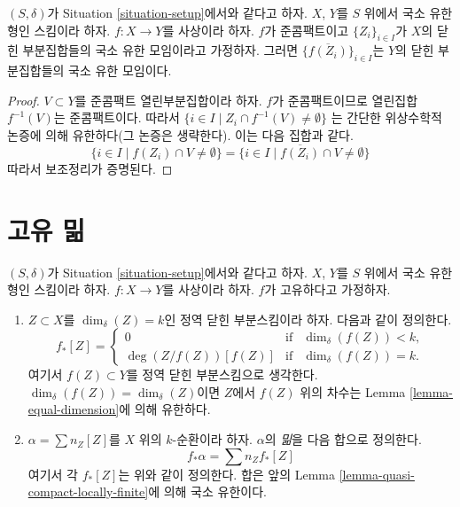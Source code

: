 \begin{lemma}
\label{lemma-quasi-compact-locally-finite}
$(S, \delta)$가 Situation \ref{situation-setup}에서와 같다고 하자.
$X$, $Y$를 $S$ 위에서 국소 유한형인 스킴이라 하자.
$f : X \to Y$를 사상이라 하자.
$f$가 준콤팩트이고 $\{Z_i\}_{i \in I}$가 $X$의 닫힌 부분집합들의
국소 유한 모임이라고 가정하자.
그러면 $\{\overline{f(Z_i)}\}_{i \in I}$는 $Y$의 닫힌 부분집합들의
국소 유한 모임이다.
\end{lemma}

\begin{proof}
$V \subset Y$를 준콤팩트 열린부분집합이라 하자.
$f$가 준콤팩트이므로 열린집합 $f^{-1}(V)$는 준콤팩트이다.
따라서
$\{i \in I \mid Z_i \cap f^{-1}(V) \not = \emptyset \}$
는 간단한 위상수학적 논증에 의해 유한하다(그 논증은 생략한다).
이는 다음 집합과 같다.
$$
\{i \in I \mid f(Z_i) \cap V \not = \emptyset \} =
\{i \in I \mid \overline{f(Z_i)} \cap V \not = \emptyset \}
$$
따라서 보조정리가 증명된다.
\end{proof}









\section{고유 밂}
\label{section-proper-pushforward}

\begin{definition}
\label{definition-proper-pushforward}
$(S, \delta)$가 Situation \ref{situation-setup}에서와 같다고 하자.
$X$, $Y$를 $S$ 위에서 국소 유한형인 스킴이라 하자.
$f : X \to Y$를 사상이라 하자.
$f$가 고유하다고 가정하자.
\begin{enumerate}
\item $Z \subset X$를 $\dim_\delta(Z) = k$인 정역 닫힌 부분스킴이라 하자.
다음과 같이 정의한다.
$$
f_*[Z] =
\left\{
\begin{matrix}
0 & \text{if} & \dim_\delta(f(Z))< k, \\
\deg(Z/f(Z)) [f(Z)] & \text{if} & \dim_\delta(f(Z)) = k.
\end{matrix}
\right.
$$
여기서 $f(Z) \subset Y$를 정역 닫힌 부분스킴으로 생각한다.
$\dim_\delta(f(Z)) = \dim_\delta(Z)$이면 $Z$에서 $f(Z)$ 위의 차수는
Lemma \ref{lemma-equal-dimension}에 의해 유한하다.
\item $\alpha = \sum n_Z [Z]$를 $X$ 위의 $k$-순환이라 하자. $\alpha$의
{\it 밂}을 다음 합으로 정의한다.
$$
f_* \alpha = \sum n_Z f_*[Z]
$$
여기서 각 $f_*[Z]$는 위와 같이 정의한다. 합은 앞의
Lemma \ref{lemma-quasi-compact-locally-finite}에 의해 국소 유한이다.
\end{enumerate}
\end{definition}

